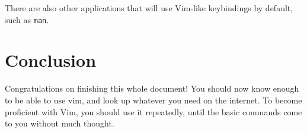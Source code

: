 \documentclass[11pt]{article}
\begin{document}
There are also other applications that will use Vim-like keybindings by default,
such as \texttt{man}.
\section{Conclusion}
\label{sec:org30abc0f}
Congratulations on finishing this whole document! You should now know enough to
be able to use vim, and look up whatever you need on the internet. To become
proficient with Vim, you should use it repeatedly, until the basic commands come
to you without much thought.
\end{document}
